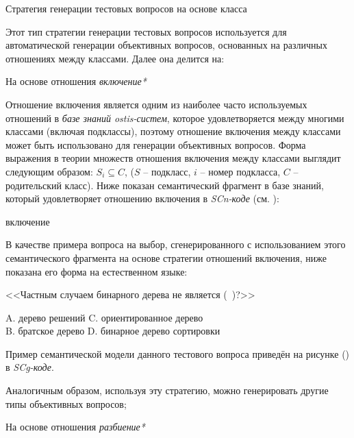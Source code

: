 \begin{textitemize}
	\item Стратегия генерации тестовых вопросов на основе класса
	
	Этот тип стратегии генерации тестовых вопросов используется для автоматической генерации объективных вопросов, основанных на различных отношениях между классами. Далее она делится на:
	
	\begin{textitemize}
		\item На основе отношения \textit{включение*}
		
		Отношение включения является одним из наиболее часто используемых отношений в \textit{базе знаний ostis-систем}, которое удовлетворяется между многими классами (включая подклассы), поэтому отношение включения между классами может быть использовано для генерации объективных вопросов. Форма выражения в теории множеств отношения включения между классами выглядит следующим образом: $S_{i}\subseteq  C $, ($S$ – подкласс, $i$ – номер подкласса, $C$ – родительский класс). Ниже показан семантический фрагмент в базе знаний, который удовлетворяет отношению включения в \textit{SCn-коде} (см. ): 
		\begin{SCn}
			\begin{scnrelfromlist}{включение} 
			\end{scnrelfromlist}
		\end{SCn}
		В качестве примера вопроса на выбор, сгенерированного с использованием этого семантического фрагмента на основе стратегии отношений включения, ниже показана его форма на естественном языке:
		
		<<Частным случаем бинарного дерева не является (\ )?>>
		
		A. дерево решений   \quad C. ориентированное дерево \\
		B. братское дерево  \quad D. бинарное дерево сортировки
		
		Пример семантической модели данного тестового вопроса приведён на рисунке (\textit{}) в \textit{SCg-коде}.
		
		Аналогичным образом, используя эту стратегию, можно генерировать другие типы объективных вопросов;
		
		\item На основе отношения \textit{разбиение*}
		

\end{textitemize}
\end{textitemize}

